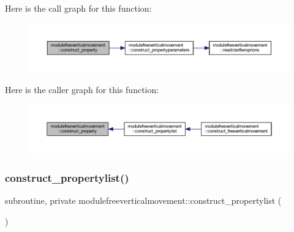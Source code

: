 Here is the call graph for this function\+:\nopagebreak
\begin{figure}[H]
\begin{center}
\leavevmode
\includegraphics[width=350pt]{namespacemodulefreeverticalmovement_af393a68b806664c9eea39ca1dec93cf9_cgraph}
\end{center}
\end{figure}
Here is the caller graph for this function\+:\nopagebreak
\begin{figure}[H]
\begin{center}
\leavevmode
\includegraphics[width=350pt]{namespacemodulefreeverticalmovement_af393a68b806664c9eea39ca1dec93cf9_icgraph}
\end{center}
\end{figure}
\mbox{\label{namespacemodulefreeverticalmovement_a5ca7e73e0a11ea273e8a65cdd0734e44}} 
\subsubsection{\texorpdfstring{construct\+\_\+propertylist()}{construct\_propertylist()}}
{\footnotesize\ttfamily subroutine, private modulefreeverticalmovement\+::construct\+\_\+propertylist (\begin{DoxyParamCaption}{ }\end{DoxyParamCaption})\hspace{0.3cm}{\ttfamily [private]}}

